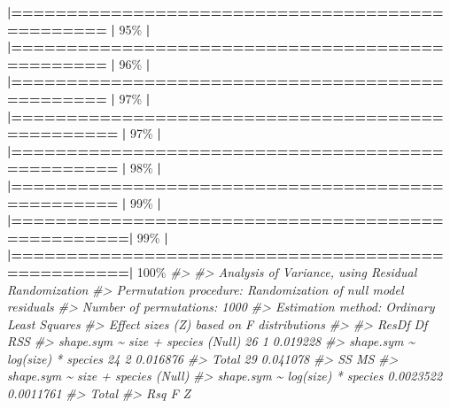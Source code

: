 \documentclass[
]{book}
\newenvironment{Shaded}{\begin{snugshade}}{\end{snugshade}}
\newcommand{\CommentTok}[1]{\textcolor[rgb]{0.56,0.35,0.01}{\textit{#1}}}
\newcommand{\DecValTok}[1]{\textcolor[rgb]{0.00,0.00,0.81}{#1}}
\newcommand{\ErrorTok}[1]{\textcolor[rgb]{0.64,0.00,0.00}{\textbf{#1}}}
\newcommand{\NormalTok}[1]{#1}
\newcommand{\SpecialCharTok}[1]{\textcolor[rgb]{0.81,0.36,0.00}{\textbf{#1}}}
\begin{document}
\begin{Shaded}
\begin{Highlighting}[]
  \ErrorTok{|================================================}  \ErrorTok{|}  \DecValTok{95}\NormalTok{\%}
  \SpecialCharTok{|}                                                        
  \ErrorTok{|================================================}  \ErrorTok{|}  \DecValTok{96}\NormalTok{\%}
  \SpecialCharTok{|}                                                        
  \ErrorTok{|================================================}  \ErrorTok{|}  \DecValTok{97}\NormalTok{\%}
  \SpecialCharTok{|}                                                        
  \ErrorTok{|=================================================} \ErrorTok{|}  \DecValTok{97}\NormalTok{\%}
  \SpecialCharTok{|}                                                        
  \ErrorTok{|=================================================} \ErrorTok{|}  \DecValTok{98}\NormalTok{\%}
  \SpecialCharTok{|}                                                        
  \ErrorTok{|=================================================} \ErrorTok{|}  \DecValTok{99}\NormalTok{\%}
  \SpecialCharTok{|}                                                        
  \ErrorTok{|==================================================|}  \DecValTok{99}\NormalTok{\%}
  \SpecialCharTok{|}                                                        
  \ErrorTok{|==================================================|} \DecValTok{100}\NormalTok{\%}
\CommentTok{\#\textgreater{} }
\CommentTok{\#\textgreater{} Analysis of Variance, using Residual Randomization}
\CommentTok{\#\textgreater{} Permutation procedure: Randomization of null model residuals }
\CommentTok{\#\textgreater{} Number of permutations: 1000 }
\CommentTok{\#\textgreater{} Estimation method: Ordinary Least Squares }
\CommentTok{\#\textgreater{} Effect sizes (Z) based on F distributions}
\CommentTok{\#\textgreater{} }
\CommentTok{\#\textgreater{}                                   ResDf Df      RSS}
\CommentTok{\#\textgreater{} shape.sym \textasciitilde{} size + species (Null)    26  1 0.019228}
\CommentTok{\#\textgreater{} shape.sym \textasciitilde{} log(size) * species      24  2 0.016876}
\CommentTok{\#\textgreater{} Total                                29    0.041078}
\CommentTok{\#\textgreater{}                                          SS        MS}
\CommentTok{\#\textgreater{} shape.sym \textasciitilde{} size + species (Null)                    }
\CommentTok{\#\textgreater{} shape.sym \textasciitilde{} log(size) * species   0.0023522 0.0011761}
\CommentTok{\#\textgreater{} Total                                                }
\CommentTok{\#\textgreater{}                                        Rsq      F      Z}

\end{Highlighting}
\end{Shaded}
\end{document}
